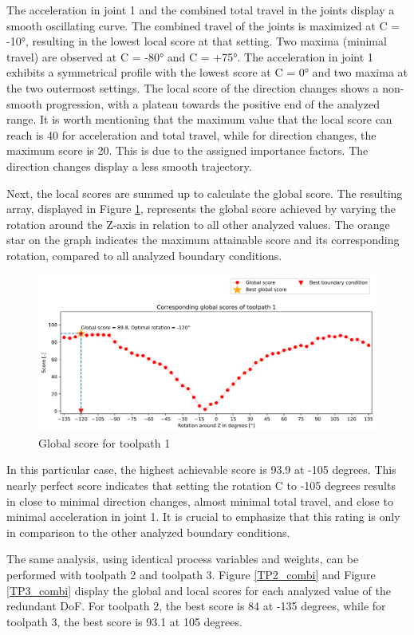 The acceleration in joint 1 and the combined total travel in the joints display a smooth oscillating curve.
The combined travel of the joints is maximized at C = -10°, resulting in the lowest local score at that setting. Two maxima (minimal travel) are observed at C = -80° and C = +75°. The acceleration in joint 1 exhibits a symmetrical profile with the lowest score at C = 0° and two maxima at the two outermost settings. The local score of the direction changes shows a non-smooth progression, with a plateau towards the positive end of the analyzed range.
It is worth mentioning that the maximum value that the local score can reach is 40 for acceleration and total travel, while for direction changes, the maximum score is 20. This is due to the assigned importance factors. The direction changes display a less smooth trajectory.

Next, the local scores are summed up to calculate the global score. The resulting array, displayed in Figure \ref{GS1}, represents the global score achieved by varying the rotation around the Z-axis in relation to all other analyzed values. The orange star on the graph indicates the maximum attainable score and its corresponding rotation, compared to all analyzed boundary conditions.
\newpage
\begin{figure}[H]
	\centerline{\includegraphics[width=1\textwidth]{figures/best_c_1.png}}
	\caption{Global score for toolpath 1}
	\label{GS1}
\end{figure}
In this particular case, the highest achievable score is 93.9 at -105 degrees. This nearly perfect score indicates that setting the rotation C to -105 degrees results in close to minimal direction changes, almost minimal total travel, and close to minimal acceleration in joint 1. It is crucial to emphasize that this rating is only in comparison to the other analyzed boundary conditions.

The same analysis, using identical process variables and weights, can be performed with toolpath 2 and toolpath 3. Figure \ref{TP2_combi} and Figure \ref{TP3_combi} display the global and local scores for each analyzed value of the redundant \acrshort{DoF}. For toolpath 2, the best score is 84 at -135 degrees, while for toolpath 3, the best score is 93.1 at 105 degrees.


